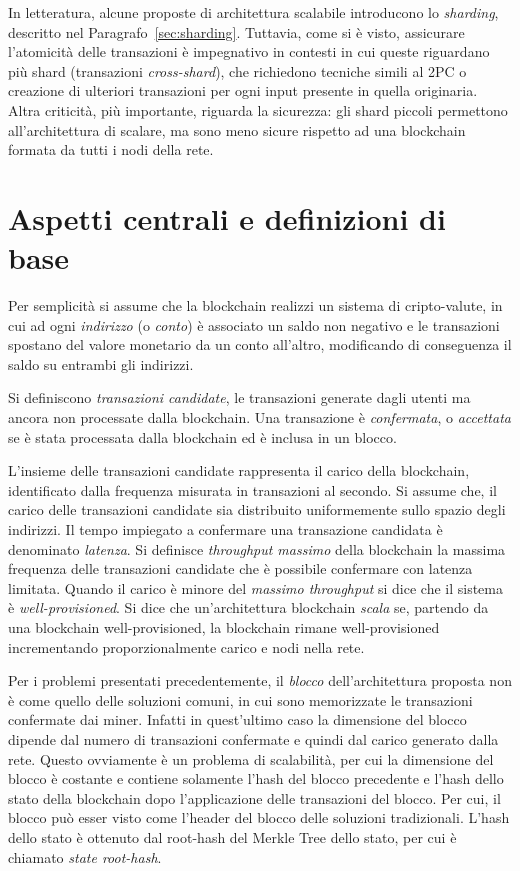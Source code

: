 In letteratura, alcune proposte di architettura scalabile introducono lo \emph{sharding}, descritto nel Paragrafo~\ref{sec:sharding}. Tuttavia, come si è visto, assicurare l'atomicità delle transazioni è impegnativo in contesti in cui queste riguardano più shard (transazioni \emph{cross-shard}), che richiedono tecniche simili al 2PC o creazione di ulteriori transazioni per ogni input presente in quella originaria. Altra criticità, più importante, riguarda la sicurezza: gli shard piccoli permettono all'architettura di scalare, ma sono meno sicure rispetto ad una blockchain formata da tutti i nodi della rete.


\section{Aspetti centrali e definizioni di base}

Per semplicità si assume che la blockchain realizzi un sistema di cripto-valute, in cui ad ogni \emph{indirizzo} (o \emph{conto}) è associato un saldo non negativo e le transazioni spostano del valore monetario da un conto all'altro, modificando di conseguenza il saldo su entrambi gli indirizzi.

Si definiscono \emph{transazioni candidate}, le transazioni generate dagli utenti ma ancora non processate dalla blockchain. Una transazione è \emph{confermata}, o \emph{accettata} se è stata processata dalla blockchain ed è inclusa in un blocco.

L'insieme delle transazioni candidate rappresenta il carico della blockchain, identificato dalla frequenza misurata in transazioni al secondo. Si assume che, il carico delle transazioni candidate sia distribuito uniformemente sullo spazio degli indirizzi. Il tempo impiegato a confermare una transazione candidata è denominato \emph{latenza}. Si definisce \emph{throughput massimo} della blockchain la massima frequenza delle transazioni candidate che è possibile confermare con latenza limitata. Quando il carico è minore del \emph{massimo throughput} si dice che il sistema è \emph{well-provisioned}.
Si dice che un'architettura blockchain \emph{scala} se, partendo da una blockchain well-provisioned, la blockchain rimane well-provisioned incrementando proporzionalmente carico e nodi nella rete.


Per i problemi presentati precedentemente, il \textit{blocco} dell'architettura proposta non è come quello delle soluzioni comuni, in cui sono memorizzate le transazioni confermate dai miner. Infatti in quest'ultimo caso la dimensione del blocco dipende dal numero di transazioni confermate e quindi dal carico generato dalla rete. Questo ovviamente è un problema di scalabilità, per cui la dimensione del blocco è costante e contiene solamente l'hash del blocco precedente e l'hash dello stato della blockchain dopo l'applicazione delle transazioni del blocco. Per cui, il blocco può esser visto come l'header del blocco delle soluzioni tradizionali. L'hash dello stato è ottenuto dal root-hash del Merkle Tree dello stato, per cui è chiamato \emph{state root-hash}.

